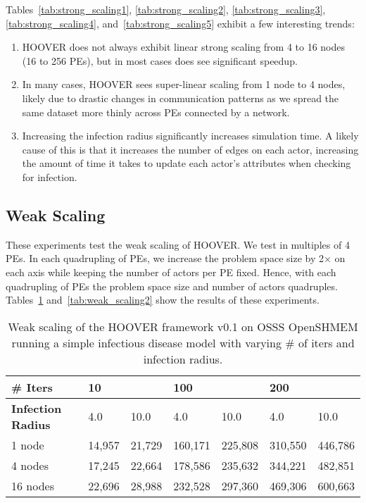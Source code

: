 Tables~\ref{tab:strong_scaling1}, \ref{tab:strong_scaling2},
\ref{tab:strong_scaling3}, \ref{tab:strong_scaling4}, and~\ref{tab:strong_scaling5} exhibit a few interesting trends:

\begin{enumerate}
    \item HOOVER does not always exhibit linear strong scaling from 4 to 16
        nodes (16 to 256 PEs), but in most cases does see significant speedup.
    \item In many cases, HOOVER sees super-linear scaling from 1 node to 4
        nodes, likely due to drastic changes in communication patterns as we
        spread the same dataset more thinly across PEs connected by a network.
    \item Increasing the infection radius significantly increases simulation
        time. A likely cause of this is that it increases the number of edges on
        each actor, increasing the amount of time it takes to update each
        actor's attributes when checking for infection.
\end{enumerate}

\subsection{Weak Scaling}
\label{sec:weak_scaling}

These experiments test the weak scaling of HOOVER. We test in multiples of 4
PEs. In each quadrupling of PEs, we increase the problem space size by 2$\times$
on each axis while keeping the number of actors per PE fixed. Hence, with each
quadrupling of PEs the problem space size and number of actors quadruples.
Tables~\ref{tab:weak_scaling1} and~\ref{tab:weak_scaling2} show the results of these experiments.

\begin{table}
\centering
\begin{tabularx}{\textwidth}{ | l || X | X | X | X | X | X | }
\hline
\textbf{\# Iters}           & \multicolumn{2}{|X|}{\textbf{10}} & \multicolumn{2}{|X|}{\textbf{100}} & \multicolumn{2}{|X|}{\textbf{200}} \\\hline
\textbf{Infection Radius}   & 4.0          & 10.0         & 4.0           & 10.0          & 4.0           & 10.0 \\\hline
1 node                      & 14,957 & 21,729 & 160,171 & 225,808 & 310,550 & 446,786 \\\hline
4 nodes                     & 17,245 & 22,664 & 178,586 & 235,632 & 344,221 & 482,851 \\\hline
16 nodes                    & 22,696 & 28,988 & 232,528 & 297,360 & 469,306 & 600,663 \\\hline
\end{tabularx}
\caption{Weak scaling of the HOOVER framework v0.1 on OSSS OpenSHMEM running a
    simple infectious disease model with varying \# of iters and infection
    radius.}
\label{tab:weak_scaling1}
\end{table}

